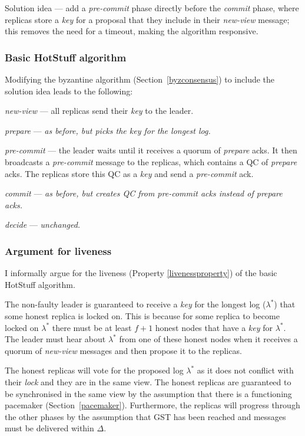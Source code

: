Solution idea --- add a \textit{pre-commit} phase directly before the \textit{commit} phase, where replicas store a \textit{key} for a proposal that they include in their \textit{new-view} message; this removes the need for a timeout, making the algorithm responsive.

\subsubsection{Basic HotStuff algorithm}

Modifying the byzantine algorithm (Section~\ref{byzconsensus}) to include the solution idea leads to the following:

\begin{description}
	\item \textit{new-view} --- all replicas send their \textit{key} to the leader.
	\item \textit{prepare} ---  \textit{as before, but picks the key for the longest log.}
	\item \textit{pre-commit} --- the leader waits until it receives a quorum of \textit{prepare} acks. It then broadcasts a \textit{pre-commit} message to the replicas, which contains a QC of \textit{prepare} acks. The replicas store this QC as a \textit{key} and send a \textit{pre-commit} ack.
	\item \textit{commit} --- \textit{as before, but creates QC from pre-commit acks instead of prepare acks.}
	\item \textit{decide} --- \textit{unchanged.}
\end{description}

\subsubsection{Argument for liveness} \label{livenessargument}
I informally argue for the liveness (Property \ref{livenessproperty}) of the basic HotStuff algorithm.

The non-faulty leader is guaranteed to receive a \textit{key} for the longest log ($\lambda^*$) that some honest replica is locked on. This is because for some replica to become locked on $\lambda^*$ there must be at least $f + 1$ honest nodes that have a \textit{key} for $\lambda^*$. The leader must hear about $\lambda^*$ from one of these honest nodes when it receives a quorum of \textit{new-view} messages and then propose it to the replicas.

The honest replicas will vote for the proposed log $\lambda^*$ as it does not conflict with their \textit{lock} and they are in the same view. The honest replicas are guaranteed to be synchronised in the same view by the assumption that there is a functioning pacemaker (Section~\ref{pacemaker}). Furthermore, the replicas will progress through the other phases by the assumption that GST has been reached and messages must be delivered within $\Delta$.

